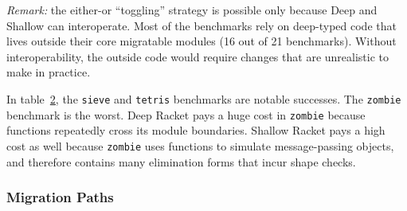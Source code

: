 \documentclass[screen=true, natbib=false, 10pt, sigplan]{acmart}
\newcommand{\Scribtexttt}[1]{{\texttt{#1}}}
\newcommand{\Ssubsubsection}[2]{\subsubsection[#1]{#2}}
\newcommand{\FigureRef}[2]{#1}
\begin{document}
\emph{Remark:} the either{-}or {``}toggling{''} strategy is possible only
because Deep and Shallow can interoperate.
Most of the benchmarks rely on deep{-}typed
code that lives outside their  core migratable modules (16 out of 21 benchmarks).
Without interoperability, the outside code would require changes that are
unrealistic to make in practice.

In table~\hyperref[t:x28counter_x28x22figurex22_x22figx3aevaluationx3amixedx2dworstx2dtablex22x29x29]{\FigureRef{2}{t:x28counter_x28x22figurex22_x22figx3aevaluationx3amixedx2dworstx2dtablex22x29x29}}, the \Scribtexttt{sieve} and
\Scribtexttt{tetris} benchmarks are notable successes.
The \Scribtexttt{zombie} benchmark is the worst.
Deep Racket pays a huge cost in \Scribtexttt{zombie} because functions
repeatedly cross its module boundaries.
Shallow Racket pays a high cost as well because \Scribtexttt{zombie}
uses functions to simulate message{-}passing objects, and therefore contains
many elimination forms that incur shape checks.


\Ssubsubsection{Migration Paths}{Migration Paths}\label{t:x28part_x22secx3aevaluationx3aperfx3apathx22x29}
\end{document}
